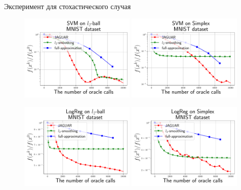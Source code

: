 \documentclass{beamer}
\begin{document}

\begin{frame}{Эксперимент для стохастического случая}

    \begin{figure}[H]
        \centering
        \includegraphics[width=0.49\textwidth]{figures/Stochastics_TPF_FW_SVM_L2_MNIST.pdf}
        \includegraphics[width=0.49\textwidth]{figures/Stochastics_TPF_FW_SVM_Simplex_MNIST.pdf}

        \includegraphics[width=0.49\textwidth]{figures/Stochastics_TPF_FW_LogReg_L2_MNIST.pdf}
        \includegraphics[width=0.49\textwidth]{figures/Stochastics_TPF_FW_LogReg_Simplex_MNIST.pdf}
        
    \end{figure}

\end{frame}
\end{document}
